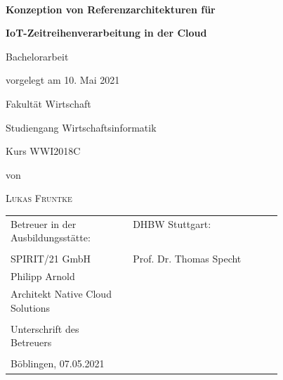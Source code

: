 \newcommand{\typMeinerArbeit}{Bachelorarbeit} 

\newcommand{\themaMeinerArbeit}{Konzeption von Referenzarchitekturen für IoT-Zeitreihenverarbeitung in der Cloud}

\newcommand{\meinName}{Lukas Fruntke}

\thispagestyle{empty}

\begin{spacing}{1}
\begin{center}	
~\vspace{0mm}

{\sffamily
\Large  
\textbf{Konzeption von Referenzarchitekturen für}

\bigskip
\textbf{IoT-Zeitreihenverarbeitung in der Cloud}
}


\vspace{15mm}

{\Large \typMeinerArbeit}

\vspace{1cm}

vorgelegt am 10. Mai 2021

\vspace{15mm}

Fakultät Wirtschaft
\medskip

Studiengang Wirtschaftsinformatik
\medskip

Kurs WWI2018C 

\vspace{10mm}

von

\vspace{10mm}

{\large\textsc{\meinName}}

\vspace{10mm}
\end{center}

\vfill

\begin{tabular}{p{0.45\linewidth}l}
Betreuer in der Ausbildungsstätte: & DHBW Stuttgart: \\
\hspace{0.4\linewidth} & \\
 SPIRIT/21 GmbH  &  Prof. Dr. Thomas Specht  \\
 Philipp Arnold    \\
 Architekt Native Cloud Solutions  \\
\\
Unterschrift des Betreuers \\
\noalign{\vspace{1.2cm}}    \\
Böblingen, 07.05.2021 \\
\end{tabular}



\end{spacing}
